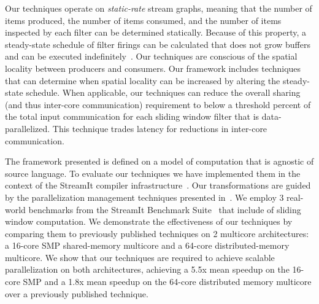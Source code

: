 Our techniques operate on {\it static-rate} stream graphs, meaning
that the number of items produced, the number of items consumed, and
the number of items inspected by each filter can be determined
statically.  Because of this property, a steady-state schedule of
filter firings can be calculated that does not grow buffers and can be
executed indefinitely~\cite{lee87}.  Our techniques are conscious of
the spatial locality between producers and consumers.  Our framework
includes techniques that can determine when spatial locality can be
increased by altering the steady-state schedule.  When applicable, our
techniques can reduce the overall sharing (and thus inter-core
communication) requirement to below a threshold percent of the total
input communication for each sliding window filter that is
data-parallelized.  This technique trades latency for reductions in
inter-core communication.

The framework presented is defined on a model of computation that is
agnostic of source language.  To evaluate our techniques we have
implemented them in the context of the StreamIt compiler
infrastructure~\cite{gordon-asplos06}.  Our transformations are guided
by the parallelization management techniques presented
in~\cite{gordon-asplos06}.  We employ 3 real-world benchmarks from the
StreamIt Benchmark Suite~\cite{streamit-suite} that include of sliding
window computation.  We demonstrate the effectiveness of our
techniques by comparing them to previously published techniques on 2
multicore architectures: a 16-core SMP shared-memory multicore and a
64-core distributed-memory multicore.  We show that our techniques are
required to achieve scalable parallelization on both architectures,
achieving a 5.5x mean speedup on the 16-core SMP and a 1.8x mean
speedup on the 64-core distributed memory multicore over a previously
published technique.

